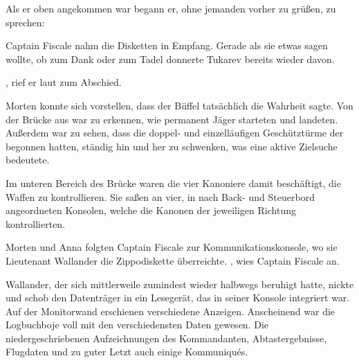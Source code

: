 Als er oben angekommen war begann er, ohne jemanden vorher zu grüßen, zu sprechen: 

\par

Captain Fiscale nahm die Disketten in Empfang. Gerade als sie etwas sagen wollte, ob zum Dank oder zum Tadel donnerte Tukarev bereits wieder davon.

\par

, rief er laut zum Abschied. 

\par

Morten konnte sich vorstellen, dass der Büffel tatsächlich die Wahrheit sagte. Von der Brücke aus war zu erkennen, wie permanent Jäger starteten und landeten. Außerdem war zu sehen, dass die doppel- und einzelläufigen Geschütztürme der  begonnen hatten, ständig hin und her zu schwenken, was eine aktive Zielsuche bedeutete.

\par

Im unteren Bereich des Brücke waren die vier Kanoniere damit beschäftigt, die Waffen zu kontrollieren. Sie saßen an vier, in nach Back- und Steuerbord angeordneten Konsolen, welche die Kanonen der jeweiligen Richtung kontrollierten.

\par

Morten und Anna folgten Captain Fiscale zur Kommunikationskonsole, wo sie Lieutenant Wallander die Zippodiskette überreichte. , wies Captain Fiscale an.

\par

Wallander, der sich mittlerweile zumindest wieder halbwegs beruhigt hatte, nickte und schob den Datenträger in ein Lesegerät, das in seiner Konsole integriert war. Auf der Monitorwand erschienen verschiedene Anzeigen. Anscheinend war die Logbuchboje voll mit den verschiedensten Daten gewesen. Die niedergeschriebenen Aufzeichnungen des Kommandanten, Abtastergebnisse, Flugdaten und zu guter Letzt auch einige Kommuniqués.

\par

